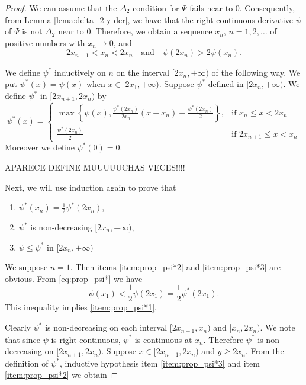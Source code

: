 \documentclass[twoside]{article}
\theoremstyle{remark}
\renewcommand{\leq}{\leqslant}
\renewcommand{\geq}{\geqslant}
\begin{document}
\begin{proof} We can assume that the $\Delta_2$ condition for $\Psi$ fails near to $0$. Consequently, from Lemma \ref{lema:delta_2 y der}, we have that the right continuous derivative $\psi$ of $\Psi$ is not $\Delta_2$ near to $0$. Therefore, we obtain a sequence $x_n$, $n=1,2,\ldots$ of positive numbers with $x_n\to 0$, and
\begin{equation}\label{eq:prop_psi*}2x_{n+1}<x_n<2x_n\quad\text{and}\quad \psi(2x_n)> 2\psi(x_n).
 \end{equation}

We define $\psi^*$ inductively on $n$ on the interval $[2x_n,+\infty)$ of the following way.   
We put $\psi^*(x)=\psi(x)$ when  $x\in[ 2x_1,+\infty)$. 
Suppose $\psi^*$ defined in $[2x_n,+\infty)$. We define $\psi^*$ in $[2x_{n+1},2x_n)$ by
\[
 \psi^*(x)=\left\{
\begin{array}{cc}
  \max\left\{\psi(x),\frac{\psi^*(2x_n)}{2x_n}(x-x_n)+\frac{ \psi^*(2x_n)}{2}\right\},& \text{if } x_n\leq x<2x_n\\
   \frac{\psi^*(2x_n)}{2}& \text{if }2x_{n+1} \leq x<x_n
  \end{array}
\right.
\]
Moreover we define $\psi^*(0)=0$. 

APARECE DEFINE MUUUUUCHAS  VECES!!!!

Next, we will use induction again  to prove that
\begin{enumerate}
 \item\label{item:prop_psi*1} $\psi^*(x_n)=\frac12\psi^*(2x_n)$,
 \item\label{item:prop_psi*2}  $\psi^*$ is non-decreasing $[2x_{n},+\infty)$,
 \item\label{item:prop_psi*3}   $\psi\leq \psi^*$ in  $[2x_{n},+\infty)$
\end{enumerate}

We suppose $n=1$. Then items \ref{item:prop_psi*2} and \ref{item:prop_psi*3} are obvious. From \eqref{eq:prop_psi*} we have
\[\psi(x_1)<\frac12\psi(2x_1)=\frac12\psi^*(2x_1).\]
This inequality implies \ref{item:prop_psi*1}.

 Clearly $\psi^*$ is non-decreasing on each interval $[2x_{n+1},x_n)$ and $[x_n,2x_n)$. We note that since $\psi$ is right continuous, $\psi^*$ is continuous at $x_n$. Therefore $\psi^*$ is non-decreasing on $[2x_{n+1},2x_n)$. Suppose $x\in[2x_{n+1},2x_n)$ and $y\geq 2x_n$.  From the definition of $\psi^*$, inductive hypothesis item \ref{item:prop_psi*3} and item \ref{item:prop_psi*2} we obtain


\end{proof}
\end{document}
